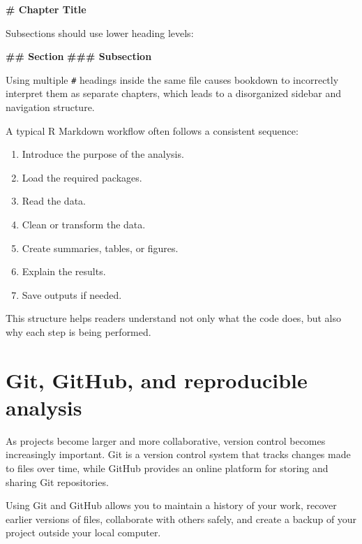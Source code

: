 \documentclass[
  11pt,
  oneside]{book}
\newenvironment{Shaded}{\begin{snugshade}}{\end{snugshade}}
\newcommand{\FunctionTok}[1]{\textcolor[rgb]{0.13,0.29,0.53}{\textbf{#1}}}
\providecommand{\tightlist}{%
  \setlength{\itemsep}{0pt}\setlength{\parskip}{0pt}}
\begin{document}
\begin{Shaded}
\begin{Highlighting}[]
\FunctionTok{\# Chapter Title}
\end{Highlighting}
\end{Shaded}

Subsections should use lower heading levels:

\begin{Shaded}
\begin{Highlighting}[]
\FunctionTok{\#\# Section}
\FunctionTok{\#\#\# Subsection}
\end{Highlighting}
\end{Shaded}

Using multiple \texttt{\#} headings inside the same file causes bookdown to incorrectly interpret them as separate chapters, which leads to a disorganized sidebar and navigation structure.

A typical R Markdown workflow often follows a consistent sequence:

\begin{enumerate}
\def\labelenumi{\arabic{enumi}.}
\tightlist
\item
  Introduce the purpose of the analysis.
\item
  Load the required packages.
\item
  Read the data.
\item
  Clean or transform the data.
\item
  Create summaries, tables, or figures.
\item
  Explain the results.
\item
  Save outputs if needed.
\end{enumerate}

This structure helps readers understand not only what the code does, but also why each step is being performed.

\section{Git, GitHub, and reproducible analysis}\label{git-github-and-reproducible-analysis}

As projects become larger and more collaborative, version control becomes increasingly important. Git is a version control system that tracks changes made to files over time, while GitHub provides an online platform for storing and sharing Git repositories.

Using Git and GitHub allows you to maintain a history of your work, recover earlier versions of files, collaborate with others safely, and create a backup of your project outside your local computer.
\end{document}
